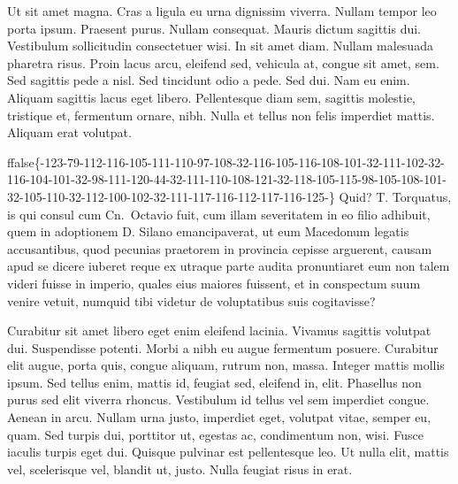 \documentclass[twoside]{extreport}
\begin{document}
Ut sit amet magna. Cras a ligula eu urna dignissim viverra. Nullam
tempor leo porta ipsum. Praesent purus. Nullam consequat. Mauris dictum
sagittis dui. Vestibulum sollicitudin consectetuer wisi. In sit amet
diam. Nullam malesuada pharetra risus. Proin lacus arcu, eleifend sed,
vehicula at, congue sit amet, sem. Sed sagittis pede a nisl. Sed
tincidunt odio a pede. Sed dui. Nam eu enim. Aliquam sagittis lacus eget
libero. Pellentesque diam sem, sagittis molestie, tristique et,
fermentum ornare, nibh. Nulla et tellus non felis imperdiet mattis.
Aliquam erat volutpat.





















\begin{exampleblock}{}
ffalse\{-123-79-112-116-105-111-110-97-108-32-116-105-116-108-101-32-111-102-32-116-104-101-32-98-111-120-44-32-111-110-108-121-32-118-105-115-98-105-108-101-32-105-110-32-112-100-102-32-111-117-116-112-117-116-125-\}\fi{}
Quid? T. Torquatus, is qui consul cum Cn.~Octavio
fuit, cum illam severitatem in eo filio adhibuit, quem in adoptionem D.
Silano emancipaverat, ut eum Macedonum legatis accusantibus, quod
pecunias praetorem in provincia cepisse arguerent, causam apud se dicere
iuberet reque ex utraque parte audita pronuntiaret eum non talem videri
fuisse in imperio, quales eius maiores fuissent, et in conspectum suum
venire vetuit, numquid tibi videtur de voluptatibus suis cogitavisse?

Curabitur sit amet libero eget enim eleifend
lacinia. Vivamus sagittis volutpat dui. Suspendisse potenti. Morbi a
nibh eu augue fermentum posuere. Curabitur elit augue, porta quis,
congue aliquam, rutrum non, massa. Integer mattis mollis ipsum. Sed
tellus enim, mattis id, feugiat sed, eleifend in, elit. Phasellus non
purus sed elit viverra rhoncus. Vestibulum id tellus vel sem imperdiet
congue. Aenean in arcu. Nullam urna justo, imperdiet eget, volutpat
vitae, semper eu, quam. Sed turpis dui, porttitor ut, egestas ac,
condimentum non, wisi. Fusce iaculis turpis eget dui. Quisque pulvinar
est pellentesque leo. Ut nulla elit, mattis vel, scelerisque vel,
blandit ut, justo. Nulla feugiat risus in erat.
\end{exampleblock}
\end{document}
